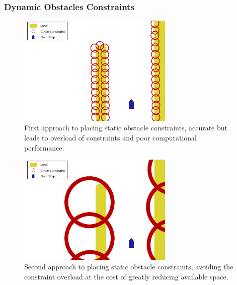 \subsubsection*{Dynamic Obstacles Constraints}
\begin{figure}[ht!]
    \centering
    \includegraphics[width=0.66\textwidth]{Images/StaticObs_Naive.pdf}
    \caption{First approach to placing static obstacle constraints, accurate but leads to overload of constraints and poor computational performance.}     \label{FIG: Static Obs Naive approach 1}
\end{figure}
\begin{figure}[ht!]
    \centering 
    \includegraphics[width=0.66\textwidth]{Images/StaticObs_Naive2.pdf}
    \caption{Second approach to placing static obstacle constraints, avoiding the constraint overload at the cost of greatly reducing available space.}     \label{FIG: Static Obs Naive approach 2}
\end{figure}


